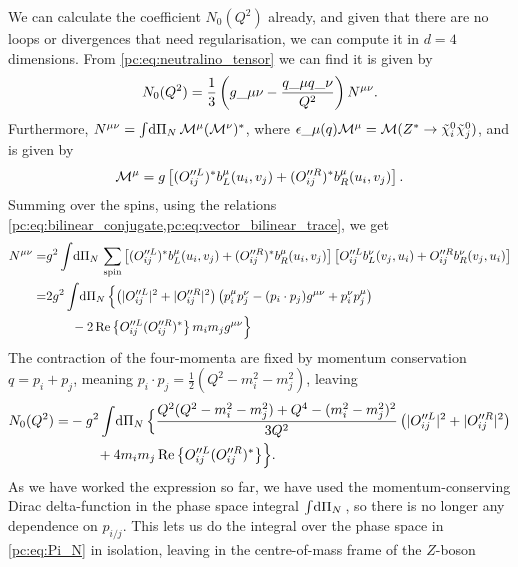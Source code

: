 \documentclass[../main.tex]{subfiles}
\begin{document}
We can calculate the coefficient \(N_0(Q^2)\) already, and given that there are no loops or divergences that need regularisation, we can compute it in \(d=4\) dimensions.
From \cref{pc:eq:neutralino_tensor} we can find it is given by
\begin{equation}
  N_0(Q^2) = \frac{1}{3} \pclosed{g\_{\mu\nu} - \frac{q\_\mu q\_\nu}{Q^2}} N\^{\mu\nu}.
\end{equation}
Furthermore, \(N\^{\mu\nu} = \integral{\Pi_N} \M\^\mu (\M\^\nu)^\ast\), where \(\epsilon\_\mu(q) \M\^\mu = \M(Z^\ast \to \tilde\chi^0_i \tilde\chi^0_j)\), and is given by
\begin{equation}
  \M\^\mu = g \bclosed{(O_{ij}^{\prime\prime L})^\ast b^\mu_L(u_i, v_j) + (O_{ij}^{\prime\prime R})^\ast b^\mu_R(u_i, v_j)}.
\end{equation}
Summing over the spins, using the relations \cref{pc:eq:bilinear_conjugate,pc:eq:vector_bilinear_trace}, we get
\begin{align}
  \nonumber
  N\^{\mu\nu} = & g^2 \integral{\Pi_N} \sum_\text{spin} \bclosed{(O_{ij}^{\prime\prime L})^\ast b^\mu_L(u_i, v_j) + (O_{ij}^{\prime\prime R})^\ast b^\mu_R(u_i, v_j)} \bclosed{O_{ij}^{\prime\prime L} b^\nu_L(v_j, u_i) + O_{ij}^{\prime\prime R} b^\nu_R(v_j, u_i)} \\
  \nonumber
  =             & 2g^2 \integral{\Pi_N} \Bigl\{\pclosed{|O_{ij}^{\prime\prime L}|^2 + |O_{ij}^{\prime\prime R}|^2} \pclosed{p_i^\mu p_j^\nu - (p_i\cdot p_j)\g + p_i^\nu p_j^\mu}                                                                                     \\
                & \qquad - 2\Re{O_{ij}^{\prime\prime L} (O_{ij}^{\prime\prime R})^\ast} m_i m_j \g \Bigr\}
\end{align}
The contraction of the four-momenta are fixed by momentum conservation \(q = p_i + p_j\), meaning \(p_i \cdot p_j = \frac{1}{2}(Q^2-m_i^2-m_j^2)\), leaving
\begin{align}
  N_0(Q^2) = & -g^2 \int \!\mathrm{d}\Pi_N\, \Bigl\{\frac{Q^2(Q^2-m_i^2-m_j^2) + Q^4 - (m_i^2-m_j^2)^2}{3Q^2} \left(|O_{ij}^{\prime\prime L}|^2+|O_{ij}^{\prime\prime R}|^2\right) \\
             & \qquad + 4m_i m_j \operatorname{Re}\left\{O_{ij}^{\prime\prime L} (O_{ij}^{\prime\prime R})^\ast\right\} \Bigr\}.
\end{align}
As we have worked the expression so far, we have used the momentum-conserving Dirac delta-function in the phase space integral \(\int \!\mathrm{d}\Pi_N\,\), so there is no longer any dependence on \(p_{i/j}\).
This lets us do the integral over the phase space in \cref{pc:eq:Pi_N} in isolation, leaving in the centre-of-mass frame of the \(Z\)-boson
\end{document}
